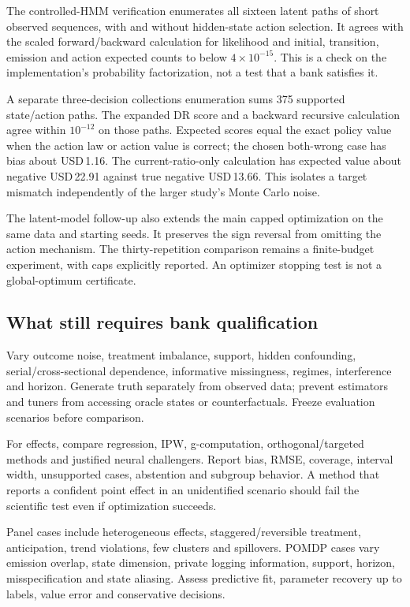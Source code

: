 The controlled-HMM verification enumerates all sixteen latent paths of
short observed sequences, with and without hidden-state action selection.
It agrees with the scaled forward/backward calculation for likelihood and
initial, transition, emission and action expected counts to below
$4\times10^{-15}$. This is a check on the implementation's probability
factorization, not a test that a bank satisfies it.

A separate three-decision collections enumeration sums 375 supported
state/action paths. The expanded DR score and a backward recursive
calculation agree within $10^{-12}$ on those paths. Expected scores equal
the exact policy value when the action law or action value is correct;
the chosen both-wrong case has bias about USD\,1.16. The current-ratio-only
calculation has expected value about negative USD\,22.91 against true
negative USD\,13.66. This isolates a target mismatch independently of
the larger study's Monte Carlo noise.

The latent-model follow-up also extends the main capped optimization on
the same data and starting seeds. It preserves the sign reversal from
omitting the action mechanism. The thirty-repetition comparison remains
a finite-budget experiment, with caps explicitly reported. An optimizer
stopping test is not a global-optimum certificate.

\subsection{What still requires bank qualification}
Vary outcome noise, treatment imbalance, support, hidden confounding,
serial/cross-sectional dependence, informative missingness, regimes,
interference and horizon. Generate truth separately from observed data;
prevent estimators and tuners from accessing oracle states or counterfactuals.
Freeze evaluation scenarios before comparison.

For effects, compare regression, IPW, g-computation, orthogonal/targeted
methods and justified neural challengers. Report bias, RMSE, coverage,
interval width, unsupported cases, abstention and subgroup behavior.
A method that reports a confident point effect in an unidentified
scenario should fail the scientific test even if optimization succeeds.

Panel cases include heterogeneous effects, staggered/reversible treatment,
anticipation, trend violations, few clusters and spillovers. POMDP cases
vary emission overlap, state dimension, private logging information,
support, horizon, misspecification and state aliasing. Assess predictive
fit, parameter recovery up to labels, value error and conservative decisions.

